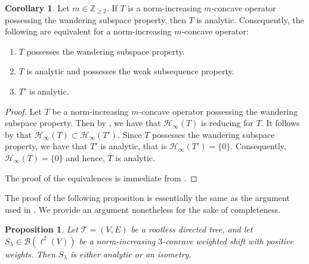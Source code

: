 \documentclass[11pt, reqno, a4paper]{amsart}
\newtheorem{proposition}[theorem]{Proposition}
\theoremstyle{definition}
\newtheorem{corollary}[theorem]{Corollary}
\newcommand{\calB}{{\mathcal{B}}}
\newcommand{\calH}{{\mathcal{H}}}
\newcommand{\scrT}{{\mathscr T}}
\renewcommand{\ge}{\geqslant}
\newcommand{\Z}{\mathbb Z}
\numberwithin{equation}{section}
\begin{document}
    \begin{corollary}
        Let $m \in \Z_{\ge 2}$. If $T$ is a norm-increasing $m$-concave operator possessing the wandering subspace property, then $T$ is analytic. Consequently, the following are equivalent for a norm-increasing $m$-concave operator:
        \begin{enumerate}
        \item[\rm (i)] $T$ possesses the wandering subspace property.
        \item[\rm (ii)] $T$ is analytic and possesses the weak subsequence property.
        \item[\rm (iii)] $T'$ is analytic.
    \end{enumerate}
    \end{corollary}
    \begin{proof}
        Let $T$ be a norm-increasing $m$-concave operator possessing the wandering subspace property. Then by , we have that $\calH_{\infty} (T)$ is reducing for $T$. It follows by  that $\calH_{\infty} (T) \subset \calH_{\infty} (T')$. Since $T$ possesses the wandering subspace property, we have that $T'$ is analytic, that is $\calH_{\infty} (T') = \{ 0 \}$. Consequently, $\calH_{\infty} (T) = \{ 0\}$ and hence, $T$ is analytic. 

        The proof of the equivalences is immediate from .
    \end{proof}

The proof of the following proposition is essentially the same as the argument used in \cite[Corollary 4.5]{MR5052237}. We provide an argument nonetheless for the sake of completeness.

\begin{proposition}
    Let $\scrT = ( V,  E)$ be a rootless directed tree, and let $S_{\lambda} \in \calB (\ell ^2 ( V))$ be a norm-increasing $3$-concave weighted shift with positive weights. Then $S_{\lambda}$ is either analytic or an isometry.
    \label{prop:analytic-or-isometry}
\end{proposition}
\end{document}
